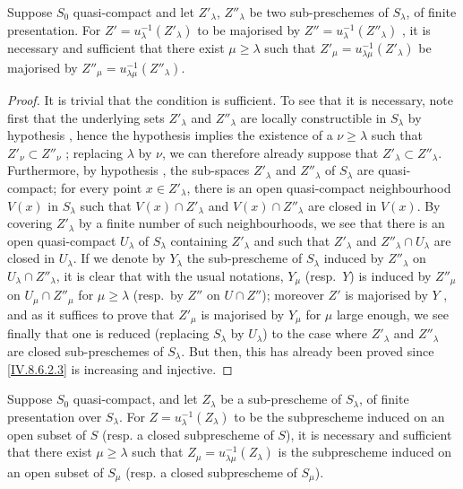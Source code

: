 \begin{corollary}[8.6.3.1]
\label{IV.8.6.3.1}
Suppose $S_0$ quasi-compact and let $Z'_\lambda$, $Z''_\lambda$ be two sub-preschemes of $S_\lambda$, of finite presentation.
For $Z'=u_\lambda^{-1}(Z'_\lambda)$ to be majorised by $Z''=u_\lambda^{-1}(Z''_\lambda)$ , it is necessary and sufficient that there exist $\mu\geqslant\lambda$ such that $Z'_\mu=u_{\lambda\mu}^{-1}(Z'_\lambda)$ be majorised by $Z''_\mu=u_{\lambda\mu}^{-1}(Z''_\lambda)$.
\end{corollary}

\begin{proof}
It is trivial that the condition is sufficient.
To see that it is necessary, note first that the underlying sets $Z'_\lambda$ and $Z''_\lambda$ are locally constructible in $S_\lambda$ by hypothesis , hence the hypothesis implies the existence of a $\nu\geqslant\lambda$ such that $Z'_\nu\subset Z''_\nu$ ; replacing $\lambda$ by $\nu$, we can therefore already suppose that $Z'_\lambda\subset Z''_\lambda$.
Furthermore, by hypothesis , the sub-spaces $Z'_\lambda$ and $Z''_\lambda$ of $S_\lambda$ are quasi-compact; for every point $x\in Z'_\lambda$, there is an open quasi-compact neighbourhood $V(x)$ in $S_\lambda$ such that $V(x)\cap Z'_\lambda$ and $V(x)\cap Z''_\lambda$ are closed in $V(x)$.
By covering $Z'_\lambda$ by a finite number of such neighbourhoods, we see that there is an open quasi-compact $U_\lambda$ of $S_\lambda$ containing $Z'_\lambda$ and such that $Z'_\lambda$ and $Z''_\lambda\cap U_\lambda$ are closed in $U_\lambda$.
If we denote by $Y_\lambda$ the sub-prescheme of $S_\lambda$ induced by $Z''_\lambda$ on $U_\lambda\cap Z''_\lambda$, it is clear that with the usual notations, $Y_\mu$ (resp.\ $Y$) is induced by $Z''_\mu$ on $U_\mu\cap Z''_\mu$ for $\mu\geqslant\lambda$ (resp.\ by $Z''$ on $U\cap Z''$); moreover $Z'$ is majorised by $Y$ , and as it suffices to prove that $Z'_\mu$ is majorised by $Y_\mu$ for $\mu$
large enough, we see finally that one is reduced (replacing $S_\lambda$ by $U_\lambda$) to the case where $Z'_\lambda$ and $Z''_\lambda$ are closed sub-preschemes of $S_\lambda$.
But then, this has already been proved since \eqref{IV.8.6.2.3} is increasing and injective.
\end{proof}

\begin{corollary}[8.6.4]
\label{IV.8.6.4}
Suppose $S_0$ quasi-compact, and let $Z_\lambda$ be a sub-prescheme of $S_\lambda$, of finite presentation over $S_\lambda$.
For $Z=u_\lambda^{-1}(Z_\lambda)$ to be the subprescheme induced on an open subset of $S$ \textup{(resp.} a closed subprescheme of $S$\textup{)}, it is necessary and sufficient that there exist $\mu\geqslant\lambda$ such that $Z_\mu=u_{\lambda\mu}^{-1}(Z_\lambda)$ is the subprescheme induced on an open subset of $S_\mu$ \textup{(resp.} a closed subprescheme of $S_\mu$\textup{)}.
\end{corollary}

